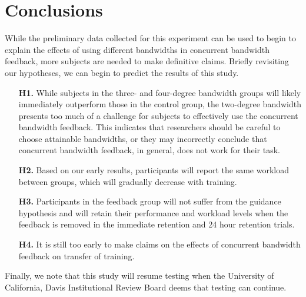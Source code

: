 \section{Conclusions}
While the preliminary data collected for this experiment can be used to begin to explain the effects of using different bandwidths in concurrent bandwidth feedback, more subjects are needed to make definitive claims.
Briefly revisiting our hypotheses, we can begin to predict the results of this study.
\begin{itemize}
    \item[\textbf{H1.}] While subjects in the three- and four-degree bandwidth groups will likely immediately outperform those in the control group, the two-degree bandwidth presents too much of a challenge for subjects to effectively use the concurrent bandwidth feedback.
    This indicates that researchers should be careful to choose attainable bandwidths, or they may incorrectly conclude that concurrent bandwidth feedback, in general, does not work for their task.
    \item[\textbf{H2.}] Based on our early results, participants will report the same workload between groups, which will gradually decrease with training.
    \item[\textbf{H3.}] Participants in the feedback group will not suffer from the guidance hypothesis and will retain their performance and workload levels when the feedback is removed in the immediate retention and 24 hour retention trials.
    \item[\textbf{H4.}] It is still too early to make claims on the effects of concurrent bandwidth feedback on transfer of training.
\end{itemize}
Finally, we note that this study will resume testing when the University of California, Davis Institutional Review Board deems that testing can continue.
